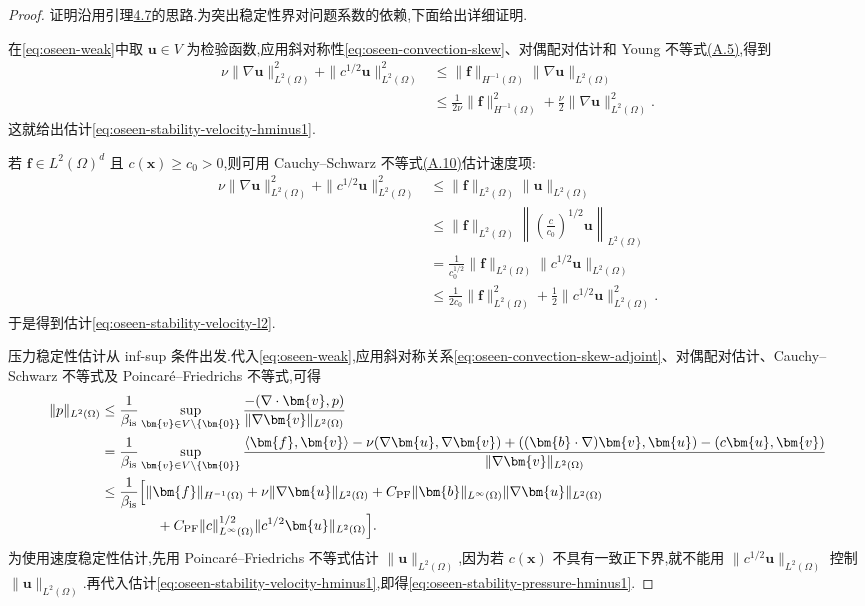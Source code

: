\begin{proof}
证明沿用引理\hyperref[lem:stokes-stability]{4.7}的思路.为突出稳定性界对问题系数的依赖,下面给出详细证明.

在\cref{eq:oseen-weak}中取 $\bm{u}\in V$ 为检验函数,应用斜对称性\cref{eq:oseen-convection-skew}、对偶配对估计和 Young 不等式\hyperref[eq:appendix-a-5]{(A.5)},得到
\[
\begin{aligned}
  \nu\|\nabla\bm{u}\|_{L^2(\Omega)}^2
    +\|c^{1/2}\bm{u}\|_{L^2(\Omega)}^2
  &\le\|\bm{f}\|_{H^{-1}(\Omega)}
      \|\nabla\bm{u}\|_{L^2(\Omega)}\\
  &\le\frac{1}{2\nu}\|\bm{f}\|_{H^{-1}(\Omega)}^2
      +\frac{\nu}{2}\|\nabla\bm{u}\|_{L^2(\Omega)}^2.
\end{aligned}
\]
这就给出估计\cref{eq:oseen-stability-velocity-hminus1}.

若 $\bm{f}\in L^2(\Omega)^d$ 且 $c(\bm{x})\ge c_0>0$,则可用 Cauchy--Schwarz 不等式\hyperref[eq:appendix-a-10]{(A.10)}估计速度项:
\[
\begin{aligned}
  \nu\|\nabla\bm{u}\|_{L^2(\Omega)}^2
    +\|c^{1/2}\bm{u}\|_{L^2(\Omega)}^2
  &\le\|\bm{f}\|_{L^2(\Omega)}\|\bm{u}\|_{L^2(\Omega)}\\
  &\le\|\bm{f}\|_{L^2(\Omega)}
      \left\|\left(\frac{c}{c_0}\right)^{1/2}\bm{u}\right\|_{L^2(\Omega)}\\
  &=\frac{1}{c_0^{1/2}}\|\bm{f}\|_{L^2(\Omega)}
      \|c^{1/2}\bm{u}\|_{L^2(\Omega)}\\
  &\le\frac{1}{2c_0}\|\bm{f}\|_{L^2(\Omega)}^2
      +\frac12\|c^{1/2}\bm{u}\|_{L^2(\Omega)}^2.
\end{aligned}
\]
于是得到估计\cref{eq:oseen-stability-velocity-l2}.

压力稳定性估计从 inf-sup 条件出发.代入\cref{eq:oseen-weak},应用斜对称关系\cref{eq:oseen-convection-skew-adjoint}、对偶配对估计、Cauchy--Schwarz 不等式及 Poincaré--Friedrichs 不等式,可得
\[
\begin{aligned}
  \|p\|_{L^2(\Omega)}
  &\le\frac{1}{\beta_{\mathrm{is}}}
    \sup_{\bm{v}\in V\setminus\{\bm{0}\}}
    \frac{-(\nabla\cdot\bm{v},p)}
         {\|\nabla\bm{v}\|_{L^2(\Omega)}}\\
  &=\frac{1}{\beta_{\mathrm{is}}}
    \sup_{\bm{v}\in V\setminus\{\bm{0}\}}
    \frac{\langle\bm{f},\bm{v}\rangle
      -\nu(\nabla\bm{u},\nabla\bm{v})
      +((\bm{b}\cdot\nabla)\bm{v},\bm{u})
      -(c\bm{u},\bm{v})}
         {\|\nabla\bm{v}\|_{L^2(\Omega)}}\\
  &\le\frac{1}{\beta_{\mathrm{is}}}\Bigl[
      \|\bm{f}\|_{H^{-1}(\Omega)}
      +\nu\|\nabla\bm{u}\|_{L^2(\Omega)}
      +C_{\mathrm{PF}}\|\bm{b}\|_{L^\infty(\Omega)}
         \|\nabla\bm{u}\|_{L^2(\Omega)}\\
  &\qquad\qquad
      +C_{\mathrm{PF}}\|c\|_{L^\infty(\Omega)}^{1/2}
         \|c^{1/2}\bm{u}\|_{L^2(\Omega)}\Bigr].
\end{aligned}
\]
为使用速度稳定性估计,先用 Poincaré--Friedrichs 不等式估计 $\|\bm{u}\|_{L^2(\Omega)}$,因为若 $c(\bm{x})$ 不具有一致正下界,就不能用 $\|c^{1/2}\bm{u}\|_{L^2(\Omega)}$ 控制 $\|\bm{u}\|_{L^2(\Omega)}$.再代入估计\cref{eq:oseen-stability-velocity-hminus1},即得\cref{eq:oseen-stability-pressure-hminus1}.


\end{proof}
